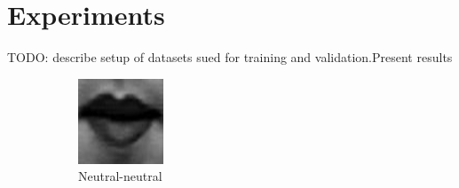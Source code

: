 \section{Experiments}
\nocite{Kanade2000CK+}\nocite{Lucey2010CK+}

TODO: describe setup of datasets sued for training and validation.Present results

\begin{figure}[H]
	\centering
	\begin{subfigure}[b]{0.15\textwidth}
		\includegraphics[width=\textwidth]{./img/timeseriesHappy/S026_006_00000001_conew1.png}
		\caption{Neutral-neutral}
		\label{fig:timeseriesHappy:a}
	\end{subfigure}
	\begin{subfigure}[b]{0.15\textwidth}

\end{subfigure}
\end{figure}
